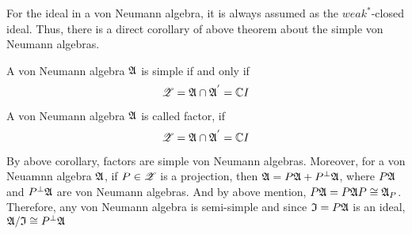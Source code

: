 For the ideal in a von Neumann algebra, it is always assumed as the $weak^*$-closed ideal. Thus, there is a direct corollary of above theorem about the simple von Neumann algebras.

\begin{cor}
		A von Neumann algebra $\mathfrak{A}$ is simple if and only if 
		\begin{equation*}
			\mathscr{Z} = \mathfrak{A} \cap \mathfrak{A}^{'} = \mathbb{C} I
		\end{equation*}
\end{cor}

\begin{defn}
	A von Neumann algebra $\mathfrak{A}$ is called factor, if 
	\begin{equation*}
		\mathscr{Z} = \mathfrak{A} \cap \mathfrak{A}^{'} = \mathbb{C} I
	\end{equation*}
\end{defn}
\begin{rem}
	By above corollary, factors are simple von Neumann algebras. Moreover, for a von Neuamnn algebra $\mathfrak{A}$,  if $P \in \mathscr{Z}$ is a projection, then $\mathfrak{A} = P \mathfrak{A} + P^{\bot} \mathfrak{A}$, where $P \mathfrak{A}$ and $P^{\bot} \mathfrak{A}$ are von Neumann algebras. And by above mention, $P \mathfrak{A} = P \mathfrak{A} P \cong \mathfrak{A}_P$. Therefore, any von Neumann algebra is semi-simple and since $\mathfrak{I} = P \mathfrak{A}$ is an ideal, $\mathfrak{A} / \mathfrak{I} \cong P^{\bot} \mathfrak{A}$
\end{rem}

